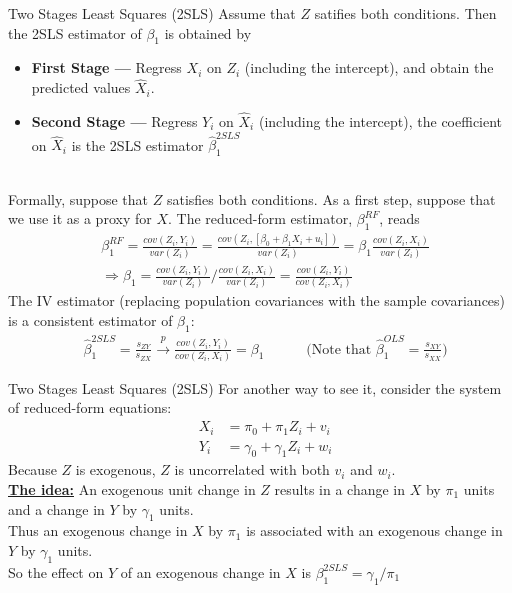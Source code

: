 \documentclass[notes,10pt, aspectratio=169]{beamer}
\begin{document}
\begin{frame}{Two Stages Least Squares (2SLS)}
Assume that $Z$ satifies both conditions. Then the 2SLS estimator of $\beta_1$ is obtained by
\begin{itemize}
    \item \textbf{First Stage ---} Regress $X_i$ on $Z_i$ (including the intercept), and obtain the predicted values $\hat{X}_i$.
    \item \textbf{Second Stage ---} Regress $Y_i$ on $\hat{X}_i$ (including the intercept), the coefficient on $\hat{X}_i$ is the 2SLS estimator $\hat{\beta}_1^{2SLS}$
\end{itemize}\\[.5em]
Formally, suppose that $Z$ satisfies both conditions. As a first step, suppose that we use it as a proxy for $X$. The reduced-form estimator, $\beta_1^{RF}$, reads
\begin{eqnarray*}
    & \beta_1^{RF} = \frac{cov(Z_i, Y_i)}{var(Z_i)}=\frac{cov(Z_i, [\beta_0 + \beta_1 X_i + u_i])}{var(Z_i)}=\beta_1\frac{cov(Z_i, X_i)}{var(Z_i)}\\
    &\Rightarrow \beta_1 = \frac{cov(Z_i, Y_i)}{var(Z_i)}/\frac{cov(Z_i, X_i)}{var(Z_i)} = \frac{cov(Z_i, Y_i)}{cov(Z_i, X_i)}
\end{eqnarray*}
The IV estimator (replacing population covariances with the sample covariances) is a consistent estimator of $\beta_1$:
 \begin{eqnarray*}
    &\hat{\beta}_1^{2SLS}= \frac{s_{ZY}}{s_{ZX}} \overset{p}{\to}  \frac{cov(Z_i, Y_i)}{cov(Z_i, X_i)} = \beta_1 \text{~~~~~~~~~}\Biggl(\text{Note that~} \hat{\beta}_1^{OLS}= \frac{s_{XY}}{s_{XX}} \Biggr)
\end{eqnarray*}

\end{frame}

\begin{frame}{Two Stages Least Squares (2SLS)}
For another way to see it, consider the system of reduced-form equations:
\begin{eqnarray*}
    & X_i &= \pi_0 + \pi_1 Z_i + v_i\\
    & Y_i &= \gamma_0 + \gamma_1 Z_i + w_i
\end{eqnarray*}
Because $Z$ is exogenous, $Z$ is uncorrelated with both $v_i$ and $w_i$.\\[1em]
\underline{\textbf{The idea:}} An exogenous unit change in $Z$ results in a change in $X$ by $\pi_1$ units and a change in $Y$ by $\gamma_1$ units.\\[1em]

Thus an exogenous change in  $X$ by $\pi_1$ is associated with an exogenous change in $Y$ by $\gamma_1$ units.\\[1em]

So the effect on $Y$ of an exogenous change in $X$ is $\beta_1^{2SLS} = \gamma_1/\pi_1$
\end{frame}
\end{document}
